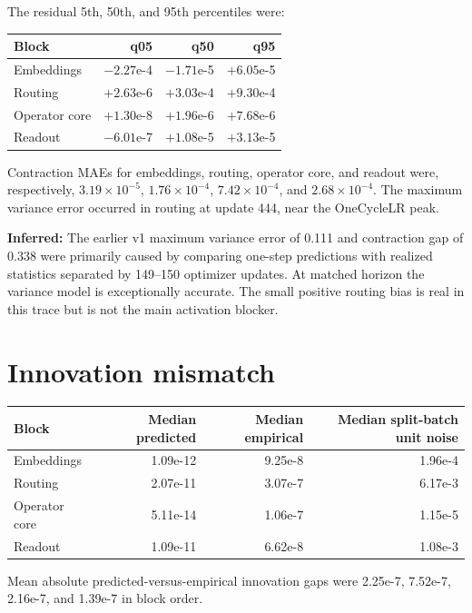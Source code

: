\documentclass[10pt,letterpaper]{article}
\newcommand{\infv}{\textbf{Inferred:} }
\begin{document}
The residual 5th, 50th, and 95th percentiles were:

\begin{center}
\small
\begin{tabular}{lrrr}
\toprule
Block & q05 & q50 & q95 \\
\midrule
Embeddings & $-2.27$e-4 & $-1.71$e-5 & $+6.05$e-5 \\
Routing & $+2.63$e-6 & $+3.03$e-4 & $+9.30$e-4 \\
Operator core & $+1.30$e-8 & $+1.96$e-6 & $+7.68$e-6 \\
Readout & $-6.01$e-7 & $+1.08$e-5 & $+3.13$e-5 \\
\bottomrule
\end{tabular}
\end{center}

Contraction MAEs for embeddings, routing, operator core, and readout were,
respectively, $3.19\times10^{-5}$, $1.76\times10^{-4}$,
$7.42\times10^{-4}$, and $2.68\times10^{-4}$.  The maximum variance error
occurred in routing at update 444, near the OneCycleLR peak.

\infv The earlier v1 maximum variance error of 0.111 and contraction gap of
0.338 were primarily caused by comparing one-step predictions with realized
statistics separated by 149--150 optimizer updates.  At matched horizon the
variance model is exceptionally accurate.  The small positive routing bias is
real in this trace but is not the main activation blocker.

\section{Innovation mismatch}

\begin{center}
\small
\begin{tabular}{lrrr}
\toprule
Block & Median predicted & Median empirical & Median split-batch unit noise \\
\midrule
Embeddings & 1.09e-12 & 9.25e-8 & 1.96e-4 \\
Routing & 2.07e-11 & 3.07e-7 & 6.17e-3 \\
Operator core & 5.11e-14 & 1.06e-7 & 1.15e-5 \\
Readout & 1.09e-11 & 6.62e-8 & 1.08e-3 \\
\bottomrule
\end{tabular}
\end{center}

Mean absolute predicted-versus-empirical innovation gaps were 2.25e-7,
7.52e-7, 2.16e-7, and 1.39e-7 in block order.
\end{document}

